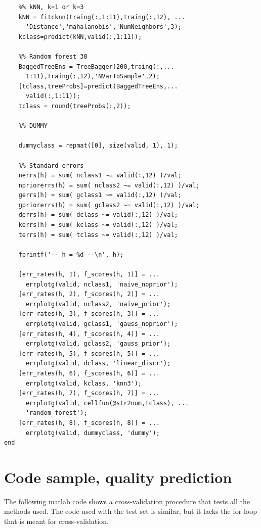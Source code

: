 \documentclass[twoside]{article}
\begin{document}
\begin{multicols}{2}
{\begin{verbatim}
    %% kNN, k=1 or k=3
    kNN = fitcknn(traing(:,1:11),traing(:,12), ...
      'Distance','mahalanobis','NumNeighbors',3);
    kclass=predict(kNN,valid(:,1:11));

    %% Random forest 30
    BaggedTreeEns = TreeBagger(200,traing(:,...
      1:11),traing(:,12),'NVarToSample',2);
    [tclass,treeProbs]=predict(BaggedTreeEns,...
      valid(:,1:11));
    tclass = round(treeProbs(:,2));
    
    %% DUMMY

    dummyclass = repmat([0], size(valid, 1), 1);

    %% Standard errors
    nerrs(h) = sum( nclass1 ~= valid(:,12) )/val;
    npriorerrs(h) = sum( nclass2 ~= valid(:,12) )/val;
    gerrs(h) = sum( gclass1 ~= valid(:,12) )/val;
    gpriorerrs(h) = sum( gclass2 ~= valid(:,12) )/val;
    derrs(h) = sum( dclass ~= valid(:,12) )/val;
    kerrs(h) = sum( kclass ~= valid(:,12) )/val;
    terrs(h) = sum( tclass ~= valid(:,12) )/val;

    fprintf('-- h = %d --\n', h);

    [err_rates(h, 1), f_scores(h, 1)] = ... 
      errplotg(valid, nclass1, 'naive_noprior');
    [err_rates(h, 2), f_scores(h, 2)] = ...
      errplotg(valid, nclass2, 'naive_prior');
    [err_rates(h, 3), f_scores(h, 3)] = ...
      errplotg(valid, gclass1, 'gauss_noprior');
    [err_rates(h, 4), f_scores(h, 4)] = ...
      errplotg(valid, gclass2, 'gauss_prior');
    [err_rates(h, 5), f_scores(h, 5)] = ...
      errplotg(valid, dclass, 'linear_discr');
    [err_rates(h, 6), f_scores(h, 6)] = ...
      errplotg(valid, kclass, 'knn3');
    [err_rates(h, 7), f_scores(h, 7)] = ...
      errplotg(valid, cellfun(@str2num,tclass), ...
      'random_forest');
    [err_rates(h, 8), f_scores(h, 8)] = ...
      errplotg(valid, dummyclass, 'dummy');
end

\end{verbatim}

}

\section{Code sample, quality prediction}\label{appendix:qualitycode}

The following matlab code shows a cross-validation procedure
that tests all the methods used. The code used with the test
set is similar, but it lacks the for-loop that is meant for 
cross-validation.

{\footnotesize

}
\end{multicols}
\end{document}
